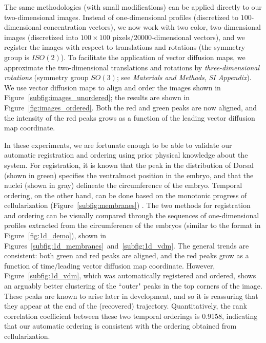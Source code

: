 \documentclass{pnastwo}
\begin{document}
\begin{article}
The same methodologies (with small modifications) can be applied directly to our two-dimensional images.
%
Instead of one-dimensional profiles (discretized to $100$-dimensional concentration vectors), we now work with
two color, two-dimensional images (discretized into $100 \times 100$ pixels/$20000$-dimensional vectors), and we register the images with respect to translations and rotations (the symmetry group is $ISO(2)$).
%
To facilitate the application of vector diffusion maps, we approximate the two-dimensional translations and rotations by {\em three-dimensional rotations} (symmetry group $SO(3)$; see {\it Materials and Methods}, {\it SI Appendix}).
%
We use vector diffusion maps to align and order the images shown in Figure~\ref{subfig:images_unordered};
the results are shown in Figure~\ref{fig:images_ordered}.
%
Both the red and green peaks are now aligned, and the intensity of the red peaks grows as a function of the leading vector diffusion map coordinate.

In these experiments, we are fortunate enough to be able to validate our  automatic registration and ordering using prior physical knowledge about the system.
%
For registration, it is known that the peak in the distribution of Dorsal (shown in green) specifies the ventralmost position in the embryo, and that the nuclei (shown in gray) delineate the circumference of the embryo.
%
%
Temporal ordering, on the other hand, can be done based on the monotonic progress of cellularization (Figure~\ref{subfig:membranes}) \cite{figard2013plasma}.%
%
The two methods for registration and ordering can be visually compared through the sequences of one-dimensional profiles extracted from the circumference of the embryos (similar to the format in Figure~\ref{fig:1d_demo}), shown in Figures~\ref{subfig:1d_membranes}~and~\ref{subfig:1d_vdm}.
%
The general trends are consistent:
both green  and red peaks are aligned, and the red peaks grow as a function of time/leading vector diffusion map coordinate.
%
However, Figure~\ref{subfig:1d_vdm}, which was automatically registered and ordered, shows an arguably better clustering of the ``outer" peaks in the top corners of the image.
%
%
These peaks are known to arise later in development, and so it is reassuring that they appear at the end of the (recovered) trajectory.
%
%
Quantitatively, the rank correlation coefficient between these two temporal orderings is 0.9158, indicating that our automatic ordering is consistent with the ordering obtained from cellularization.


\end{article}
\end{document}
